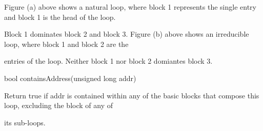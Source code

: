 \bigskip





\bigskip





\bigskip





\bigskip





\bigskip





\bigskip





\bigskip





\bigskip





\bigskip





\bigskip





\bigskip





\bigskip



{

Figure (a) above shows a natural loop, where block 1 represents the single entry and block 1 is the head of the loop.

Block 1 dominates block 2 and block 3. Figure (b) above shows an irreducible loop, where block 1 and block 2 are the

entries of the loop. Neither block 1 nor block 2 domiantes block 3.}





\bigskip



{

bool containsAddress(unsigned long addr)}



{

Return true if addr is contained within any of the basic blocks that compose this loop, excluding the block of any of

its sub-loops.}



